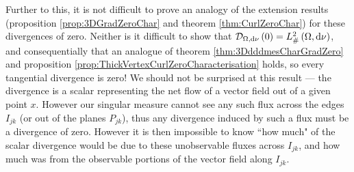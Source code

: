 Further to this, it is not difficult to prove an analogy of the extension results (proposition \ref{prop:3DGradZeroChar} and theorem \ref{thm:CurlZeroChar}) for these divergences of zero.
Neither is it difficult to show that $\mathcal{D}_{\Omega,\mathrm{d}\nu}\left( 0 \right)=L^2_{\#}\left( \Omega,\mathrm{d} \nu \right)$, and consequentially that an analogue of theorem \ref{thm:3DdddmesCharGradZero} and proposition \ref{prop:ThickVertexCurlZeroCharacterisation} holds, so every tangential divergence is zero!
We should not be surprised at this result --- the divergence is a scalar representing the net flow of a vector field out of a given point $x$.
However our singular measure cannot see any such flux across the edges $I_{jk}$ (or out of the planes $P_{jk}$), thus any divergence induced by such a flux must be a divergence of zero.
However it is then impossible to know ``how much" of the scalar divergence would be due to these unobservable fluxes across $I_{jk}$, and how much was from the observable portions of the vector field along $I_{jk}$.

